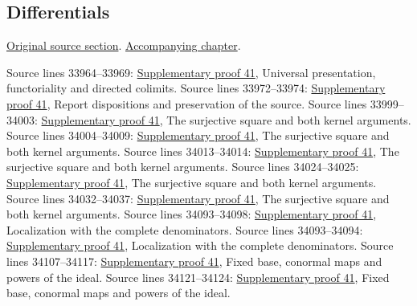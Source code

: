 \subsection{Differentials}
\hypertarget{algebra-source-section-differentials}{}
\noindent\href{https://github.com/stacks/stacks-project/blob/a04446e57ec1fbc252a871afcec7752fb2807b14/algebra.tex\#L33788}{Original source section}. \href{algebra.pdf\#nameddest=section-differentials}{Accompanying chapter}.

\begin{AlgebraSourceRoutes}
 Source lines 33964--33969: \hyperlink{algebra_differentials_notes_20260928}{Supplementary proof 41}, Universal presentation, functoriality and directed colimits.
 Source lines 33972--33974: \hyperlink{algebra_differentials_notes_20260928}{Supplementary proof 41}, Report dispositions and preservation of the source.
 Source lines 33999--34003: \hyperlink{algebra_differentials_notes_20260928}{Supplementary proof 41}, The surjective square and both kernel arguments.
 Source lines 34004--34009: \hyperlink{algebra_differentials_notes_20260928}{Supplementary proof 41}, The surjective square and both kernel arguments.
 Source lines 34013--34014: \hyperlink{algebra_differentials_notes_20260928}{Supplementary proof 41}, The surjective square and both kernel arguments.
 Source lines 34024--34025: \hyperlink{algebra_differentials_notes_20260928}{Supplementary proof 41}, The surjective square and both kernel arguments.
 Source lines 34032--34037: \hyperlink{algebra_differentials_notes_20260928}{Supplementary proof 41}, The surjective square and both kernel arguments.
 Source lines 34093--34098: \hyperlink{algebra_differentials_notes_20260928}{Supplementary proof 41}, Localization with the complete denominators.
 Source lines 34093--34094: \hyperlink{algebra_differentials_notes_20260928}{Supplementary proof 41}, Localization with the complete denominators.
 Source lines 34107--34117: \hyperlink{algebra_differentials_notes_20260928}{Supplementary proof 41}, Fixed base, conormal maps and powers of the ideal.
 Source lines 34121--34124: \hyperlink{algebra_differentials_notes_20260928}{Supplementary proof 41}, Fixed base, conormal maps and powers of the ideal.

\end{AlgebraSourceRoutes}
